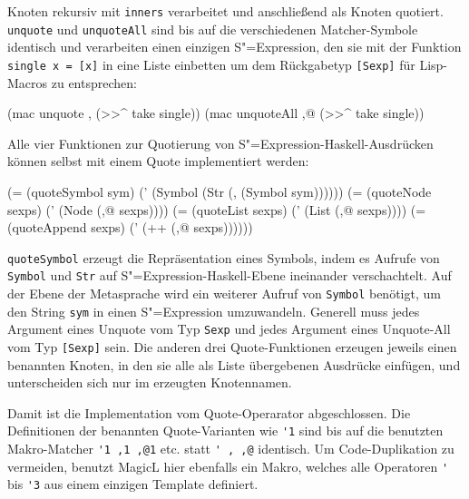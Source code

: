 \documentclass[12pt, a4paper, bibgerm]{scrbook}
\newenvironment{DIFnomarkup}{}{}
\newcommand\icode[1]{\lstinline?#1?}
\newcommand{\sexp}{S"=Expression}
\begin{document}
Knoten rekursiv mit \icode{inners} verarbeitet und anschließend als
Knoten quotiert. \icode{unquote} und \icode{unquoteAll} sind bis auf die
verschiedenen Matcher-Symbole identisch und verarbeiten einen einzigen
\sexp{}, den sie mit der Funktion \icode{single x = [x]} in eine Liste
einbetten um dem Rückgabetyp \icode{[Sexp]} für Lisp-Macros zu
entsprechen:
\begin{DIFnomarkup}\begin{code}
    (mac unquote    ,  (>>^ take single))
    (mac unquoteAll ,@ (>>^ take single))
\end{code}\end{DIFnomarkup}
Alle vier Funktionen zur Quotierung von \sexp{}-Haskell-Ausdrücken
können selbst mit einem Quote implementiert werden:
\begin{DIFnomarkup}\begin{code}
    (= (quoteSymbol sym)
       (' (Symbol (Str (, (Symbol sym))))))
    (= (quoteNode sexps)
       (' (Node (,@ sexps))))
    (= (quoteList sexps)
       (' (List (,@ sexps))))
    (= (quoteAppend sexps)
       (' (++ (,@ sexps))))))
\end{code}\end{DIFnomarkup}
\icode{quoteSymbol} erzeugt die Repräsentation eines Symbols, indem es
Aufrufe von \icode{Symbol} und \icode{Str} auf \sexp{}-Haskell-Ebene
ineinander verschachtelt. Auf der Ebene der Metasprache wird ein
weiterer Aufruf von \icode{Symbol} benötigt, um den String \icode{sym}
in einen \sexp{} umzuwandeln. Generell muss jedes Argument eines Unquote
vom Typ \icode{Sexp} und jedes Argument eines Unquote-All vom Typ
\icode{[Sexp]} sein. Die anderen drei Quote-Funktionen erzeugen jeweils
einen benannten Knoten, in den sie alle als Liste übergebenen Ausdrücke
einfügen, und unterscheiden sich nur im erzeugten Knotennamen.

Damit ist die Implementation vom Quote-Operarator abgeschlossen. Die
Definitionen der benannten Quote-Varianten wie \icode{'1} sind bis auf
die benutzten Makro-Matcher \icode{'1 ,1 ,@1} etc. statt \icode{' , ,@}
identisch. Um Code-Duplikation zu vermeiden, benutzt MagicL hier
ebenfalls ein Makro, welches alle Operatoren \icode{'}
bis \icode{'3} aus einem einzigen Template definiert.
\end{document}
